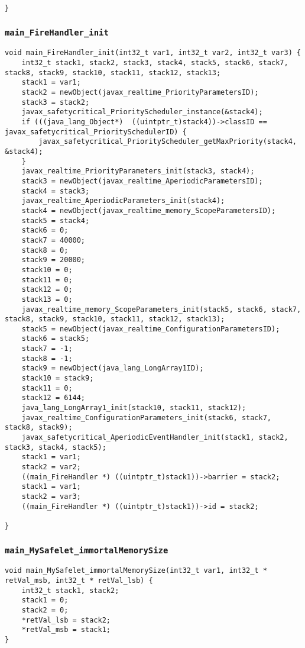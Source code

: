 \begin{landscape}
\begin{multicols}{2}
\begin{lstlisting}[firstnumber=2208]
}
\end{lstlisting}

\subsubsection{\texttt{main\_FireHandler\_init}}

\begin{lstlisting}[firstnumber=2261]
void main_FireHandler_init(int32_t var1, int32_t var2, int32_t var3) {
	int32_t stack1, stack2, stack3, stack4, stack5, stack6, stack7, stack8, stack9, stack10, stack11, stack12, stack13;
	stack1 = var1;
	stack2 = newObject(javax_realtime_PriorityParametersID);
	stack3 = stack2;
	javax_safetycritical_PriorityScheduler_instance(&stack4);
	if (((java_lang_Object*)  ((uintptr_t)stack4))->classID == javax_safetycritical_PrioritySchedulerID) {
		javax_safetycritical_PriorityScheduler_getMaxPriority(stack4, &stack4);
	}
	javax_realtime_PriorityParameters_init(stack3, stack4);
	stack3 = newObject(javax_realtime_AperiodicParametersID);
	stack4 = stack3;
	javax_realtime_AperiodicParameters_init(stack4);
	stack4 = newObject(javax_realtime_memory_ScopeParametersID);
	stack5 = stack4;
	stack6 = 0;
	stack7 = 40000;
	stack8 = 0;
	stack9 = 20000;
	stack10 = 0;
	stack11 = 0;
	stack12 = 0;
	stack13 = 0;
	javax_realtime_memory_ScopeParameters_init(stack5, stack6, stack7, stack8, stack9, stack10, stack11, stack12, stack13);
	stack5 = newObject(javax_realtime_ConfigurationParametersID);
	stack6 = stack5;
	stack7 = -1;
	stack8 = -1;
	stack9 = newObject(java_lang_LongArray1ID);
	stack10 = stack9;
	stack11 = 0;
	stack12 = 6144;
	java_lang_LongArray1_init(stack10, stack11, stack12);
	javax_realtime_ConfigurationParameters_init(stack6, stack7, stack8, stack9);
	javax_safetycritical_AperiodicEventHandler_init(stack1, stack2, stack3, stack4, stack5);
	stack1 = var1;
	stack2 = var2;
	((main_FireHandler *) ((uintptr_t)stack1))->barrier = stack2;
	stack1 = var1;
	stack2 = var3;
	((main_FireHandler *) ((uintptr_t)stack1))->id = stack2;

}
\end{lstlisting}

\subsubsection{\texttt{main\_MySafelet\_immortalMemorySize}}

\begin{lstlisting}[firstnumber=2354]
void main_MySafelet_immortalMemorySize(int32_t var1, int32_t * retVal_msb, int32_t * retVal_lsb) {
	int32_t stack1, stack2;
	stack1 = 0;
	stack2 = 0;
	*retVal_lsb = stack2;
	*retVal_msb = stack1;
}
\end{lstlisting}


\end{multicols}
\end{landscape}
